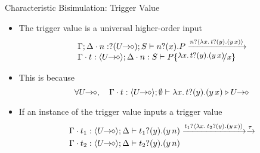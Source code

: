\documentclass{beamer}
\begin{document}
	\begin{frame}{Characteristic Bisimulation: Trigger Value}
		\begin{itemize}
			\item	The trigger value is a universal higher-order input
				\[
				\begin{array}{l}
					\Gamma; \Delta \cat n: \btinp{\shot{U}} S \proves \binp{n}{x} P
					\by{\bactinp{n}{\abs{x}{\binp{t}{y} (\appl{y}{x})}}}\\
					\Gamma \cat t: \chtype{\shot{U}}; \Delta \cat n: S %
					\proves P \subst{\abs{x}{\binp{t}{y} (\appl{y}{x})}}{x} 
				\end{array}
				\]
			\item	This is because
				\[
					\forall \shot{U}, \quad \Gamma \cat t: \chtype{\shot{U}}; \es %
					\proves \abs{x}{\binp{t}{y} (\appl{y}{x})} \hastype \shot{U}
				\]

			\item	If an instance of the trigger value inputs a trigger value
				\begin{eqnarray*}
					\Gamma \cat t_1: \chtype{\shot{U}}; \Delta
					\proves \binp{t_1}{y} (\appl{y}{n}) & \by{\bactinp{t_1}{\abs{x}{\binp{t_2}{y} (\appl{y}{x})}}} \by{\tau}\\
					\Gamma \cat t_2: \chtype{\shot{U}}; \Delta
					\proves \binp{t_2}{y} (\appl{y}{n}) %
				\end{eqnarray*}
		\end{itemize}
	\end{frame}
\end{document}
